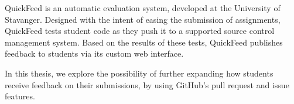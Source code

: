 
\abstract

QuickFeed is an automatic evaluation system, developed at the University of Stavanger.
Designed with the intent of easing the submission of assignments, QuickFeed tests student code as they push it to a supported source control management system.
Based on the results of these tests, QuickFeed publishes feedback to students via its custom web interface.

In this thesis, we explore the possibility of further expanding how students receive feedback on their submissions, by using GitHub's pull request and issue features.
